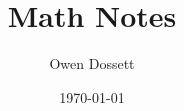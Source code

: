 \documentclass{article}
\title{Math Notes}
\author{Owen Dossett}
\date{\today}
\begin{document}
\maketitle
\tableofcontents
\newpage

\section{}
\subsection{}
\end{document}
